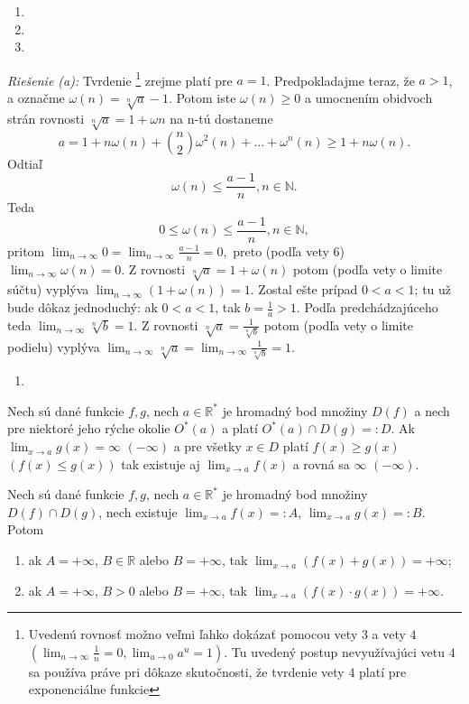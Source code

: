 \begin{enumerate}[resume]
	\item {}
	\item {}
	\item {}
\end{enumerate}

\textit{Riešenie (a):}
Tvrdenie \footnote{Uvedenú rovnosť možno veľmi ľahko dokázať pomocou vety $3$ a vety $4$ $(\lim_{n \rightarrow \infty} \frac{1}{n}=0, \lim_{u \rightarrow 0} a^u=1)$. Tu uvedený postup nevyužívajúci vetu $4$ sa používa práve pri dôkaze skutočnosti, že tvrdenie vety $4$ platí pre exponenciálne funkcie} zrejme platí pre $a=1$. Predpokladajme teraz, že $a>1$, a označme $\omega (n)=\sqrt[n]{a}-1$. Potom iste $\omega (n)\geq 0$ a umocnením obidvoch strán rovnosti $\sqrt[n]{a}=1+\omega n$ na n-tú dostaneme 
$$a=1+n \omega(n)+{n \choose 2}\omega^2 (n)+...+\omega^n (n)\geq 1+n\omega (n).$$
Odtiaľ $$\omega (n) \leq \frac{a-1}{n}, n\in \mathbb{N}.$$
Teda $$0\leq \omega (n) \leq \frac{a-1}{n}, n \in \mathbb{N},$$
pritom $\lim_{n \rightarrow \infty} 0=\lim_{n \rightarrow \infty} \frac{a-1}{n}=0,$ preto (podľa vety $6$) $\lim_{n \rightarrow \infty}\omega (n)=0.$ Z rovnosti $\sqrt[n]{a}=1+\omega (n)$ potom (podľa vety o limite súčtu) vyplýva $\lim_{n \rightarrow \infty} (1+\omega (n))=1$. Zostal ešte prípad $0<a<1$; tu už bude dôkaz jednoduchý: ak $0<a<1$, tak $b=\frac{1}{a}>1$. Podľa predchádzajúceho teda $\lim_{n \rightarrow \infty} \sqrt[n]{b}=1$. Z rovnosti $\sqrt[n]{a}=\frac{1}{\sqrt[n]{b}}$ potom (podľa vety o limite podielu) vyplýva $\lim_{n \rightarrow \infty} \sqrt[n]{a}=\lim_{n \rightarrow \infty} \frac{1}{\sqrt[n]{b}}=1$.

\begin{enumerate}[resume]
	\item {}
\end{enumerate}

\begin{veta}
Nech sú dané funkcie $f,g$, nech $a \in \mathbb{R^*}$ je hromadný bod množiny $D(f)$ a nech pre niektoré jeho rýche okolie $O^*(a)$ a platí $O^*(a)\cap D(g)=:D$. Ak $\lim_{x \rightarrow a} g(x)=\infty$  $(-\infty)$ a pre všetky $x \in D$ platí $f(x)\geq g(x)$  $(f(x)\leq g(x))$ tak existuje aj $\lim_{x \rightarrow a} f(x)$ a rovná sa $\infty$  $(-\infty)$.
\end{veta}

\begin{veta}
Nech sú dané funkcie $f,g$, nech $a \in \mathbb{R^*}$ je hromadný bod množiny $D(f)\cap D(g)$, nech existuje $\lim_{x \rightarrow a} f(x)=:A$,  $\lim_{x \rightarrow a} g(x)=:B$. Potom
\begin{enumerate}
\item ak $A=+\infty$, $B \in \mathbb{R}$ alebo $B=+\infty$, tak $\lim_{x \rightarrow a}(f(x)+g(x))=+\infty$;
\item ak $A=+\infty$, $B >0$ alebo $B=+\infty$, tak $\lim_{x \rightarrow a}(f(x)\cdot g(x))=+\infty$.
\end{enumerate}
\end{veta}


